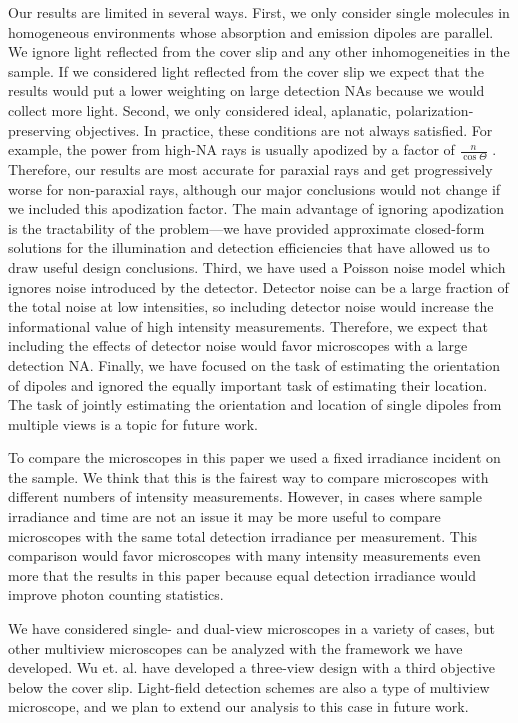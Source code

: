 \documentclass[10pt]{article}
\begin{document}
Our results are limited in several ways. First, we only consider single
molecules in homogeneous environments whose absorption and emission dipoles are
parallel. We ignore light reflected from the cover slip and any other
inhomogeneities in the sample. If we considered light reflected from the cover
slip we expect that the results would put a lower weighting on large detection
NAs because we would collect more light. Second, we only considered ideal,
aplanatic, polarization-preserving objectives. In practice, these conditions are
not always satisfied. For example, the power from high-NA rays is usually
apodized by a factor of $\frac{n}{\cos\Theta}$ \cite{nov2006}. Therefore, our
results are most accurate for paraxial rays and get progressively worse for
non-paraxial rays, although our major conclusions would not change if we
included this apodization factor. The main advantage of ignoring apodization is
the tractability of the problem---we have provided approximate closed-form
solutions for the illumination and detection efficiencies that have allowed us
to draw useful design conclusions. Third, we have used a Poisson noise model
which ignores noise introduced by the detector. Detector noise can be a large
fraction of the total noise at low intensities, so including detector noise
would increase the informational value of high intensity
measurements. Therefore, we expect that including the effects of detector noise
would favor microscopes with a large detection NA. Finally, we have focused on
the task of estimating the orientation of dipoles and ignored the equally
important task of estimating their location. The task of jointly estimating the
orientation and location of single dipoles from multiple views is a topic for
future work.

To compare the microscopes in this paper we used a fixed irradiance incident on
the sample. We think that this is the fairest way to compare microscopes with
different numbers of intensity measurements. However, in cases where sample
irradiance and time are not an issue it may be more useful to compare
microscopes with the same total detection irradiance per measurement. This
comparison would favor microscopes with many intensity measurements even more
that the results in this paper because equal detection irradiance would improve
photon counting statistics.

We have considered single- and dual-view microscopes in a variety of cases, but
other multiview microscopes can be analyzed with the framework we have
developed. Wu et. al. have developed a three-view design with a third objective
below the cover slip\cite{wu2016}. Light-field detection schemes are also a type
of multiview microscope\cite{levoy2006}, and we plan to extend our analysis to
this case in future work.
\end{document}
